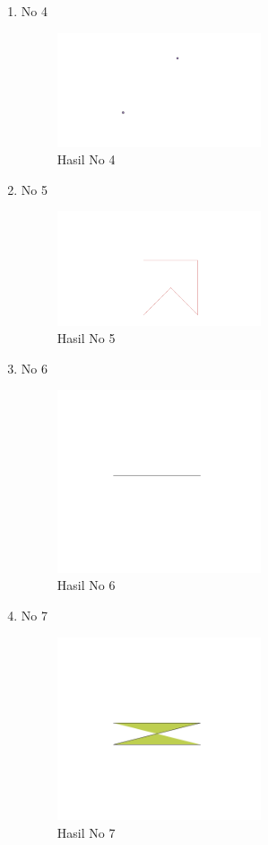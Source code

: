 \begin{enumerate}
	\item No 4
	
	\begin{figure}[H]
		\includegraphics[width=6cm]{figures/Tugas2/1174083/4.png}
		\centering
		\caption{Hasil No 4}
	\end{figure}

	\item No 5
	
	\begin{figure}[H]
		\includegraphics[width=6cm]{figures/Tugas2/1174083/5.png}
		\centering
		\caption{Hasil No 5}
	\end{figure}
	
	\item No 6
	
	\begin{figure}[H]
		\includegraphics[width=6cm]{figures/Tugas2/1174083/6.png}
		\centering
		\caption{Hasil No 6}
	\end{figure}

	\item No 7
	
	\begin{figure}[H]
		\includegraphics[width=6cm]{figures/Tugas2/1174083/7.png}
		\centering
		\caption{Hasil No 7}
	\end{figure}
	

\end{enumerate}
